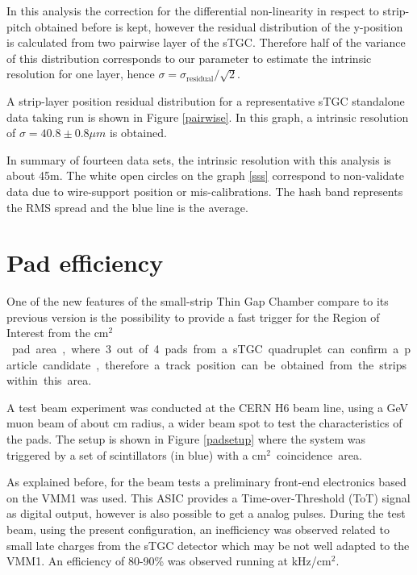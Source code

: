 In this analysis the correction for the differential non-linearity in respect to strip-pitch obtained before is kept,
however the residual distribution of the y-position is calculated from two pairwise layer of the sTGC.  Therefore half
of the variance of this distribution corresponds to our parameter to estimate the intrinsic resolution for one layer,
hence $\sigma = \sigma_{\mathrm{residual}}/\sqrt{2}$. \par
A strip-layer position residual distribution for a representative sTGC standalone data taking run is shown in Figure
\ref{pairwise}. In this graph, a intrinsic resolution of $\sigma=40.8\pm0.8\mu m$ is obtained.\par 

In summary of fourteen data sets, the intrinsic resolution with this analysis is about \unit{45}{\micro m}. The white
open circles on the graph \ref{sss} correspond to non-validate data due to wire-support position or mis-calibrations.
The hash band represents the RMS spread and the blue line is the average.\par 



\section{Pad efficiency}\label{padeff}

One of the new features of the small-strip Thin Gap Chamber compare to its previous version is the possibility to
provide a fast trigger for the Region of Interest from the \unit[8x50]{cm$^2$} pad area, where 3 out of 4 pads from a
sTGC quadruplet can confirm a particle candidate, therefore a track position can be obtained from the strips within this
area.\par

A test beam experiment was conducted at the CERN H6 beam line, using a \unit[130]{GeV} muon beam of about \unit[4]{cm}
radius, a wider beam spot to test the characteristics of the pads. The setup is shown in Figure \ref{padsetup} where the
system was triggered by a set of scintillators (in blue) with a \unit[12x12]{cm$^2$} coincidence area.\par

As explained before, for the beam tests a preliminary front-end electronics based on the VMM1 was used. This ASIC
provides a Time-over-Threshold (ToT) signal as digital output, however is also possible to get a analog pulses.  During the
test beam, using the present configuration, an inefficiency was observed related to small late charges from the sTGC
detector which may be not well adapted to the VMM1. An efficiency of 80-90\% was observed running at
\unit[100]{kHz/cm$^2$}.\par


